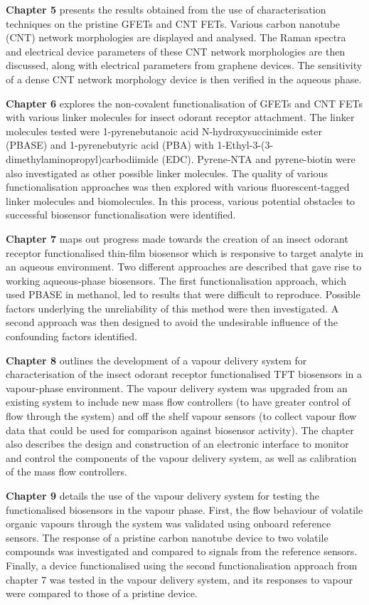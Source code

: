 \documentclass[
  a4paper,
]{scrbook}
\begin{document}
\textbf{Chapter 5} presents the results obtained from the use of
characterisation techniques on the pristine GFETs and CNT FETs. Various
carbon nanotube (CNT) network morphologies are displayed and analysed.
The Raman spectra and electrical device parameters of these CNT network
morphologies are then discussed, along with electrical parameters from
graphene devices. The sensitivity of a dense CNT network morphology
device is then verified in the aqueous phase.

\textbf{Chapter 6} explores the non-covalent functionalisation of GFETs
and CNT FETs with various linker molecules for insect odorant receptor
attachment. The linker molecules tested were 1-pyrenebutanoic acid
N-hydroxysuccinimide ester (PBASE) and 1-pyrenebutyric acid (PBA) with
1-Ethyl-3-(3-dimethylaminopropyl)carbodiimide (EDC). Pyrene-NTA and
pyrene-biotin were also investigated as other possible linker molecules.
The quality of various functionalisation approaches was then explored
with various fluorescent-tagged linker molecules and biomolecules. In
this process, various potential obstacles to successful biosensor
functionalisation were identified.

\textbf{Chapter 7} maps out progress made towards the creation of an
insect odorant receptor functionalised thin-film biosensor which is
responsive to target analyte in an aqueous environment. Two different
approaches are described that gave rise to working aqueous-phase
biosensors. The first functionalisation approach, which used PBASE in
methanol, led to results that were difficult to reproduce. Possible
factors underlying the unreliability of this method were then
investigated. A second approach was then designed to avoid the
undesirable influence of the confounding factors identified.

\textbf{Chapter 8} outlines the development of a vapour delivery system
for characterisation of the insect odorant receptor functionalised TFT
biosensors in a vapour-phase environment. The vapour delivery system was
upgraded from an existing system to include new mass flow controllers
(to have greater control of flow through the system) and off the shelf
vapour sensors (to collect vapour flow data that could be used for
comparison against biosensor activity). The chapter also describes the
design and construction of an electronic interface to monitor and
control the components of the vapour delivery system, as well as
calibration of the mass flow controllers.

\textbf{Chapter 9} details the use of the vapour delivery system for
testing the functionalised biosensors in the vapour phase. First, the
flow behaviour of volatile organic vapours through the system was
validated using onboard reference sensors. The response of a pristine
carbon nanotube device to two volatile compounds was investigated and
compared to signals from the reference sensors. Finally, a device
functionalised using the second functionalisation approach from chapter
7 was tested in the vapour delivery system, and its responses to vapour
were compared to those of a pristine device.
\end{document}
